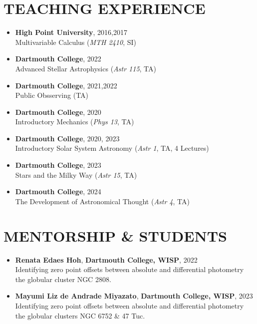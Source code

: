 \documentclass[margin, 10pt]{res} %
\begin{document}
\begin{resume}
\section{TEACHING EXPERIENCE}
\begin{itemize}
	\item {\scriptsize \textbf{High Point University}}, {\small 2016,2017} \\ Multivariable Calculus (\textit{MTH 2410}, SI)
	\item {\scriptsize \textbf{Dartmouth College}}, {\small 2022} \\ Advanced Stellar Astrophysics (\textit{Astr 115}, TA)
	\item {\scriptsize \textbf{Dartmouth College}}, {\small 2021,2022} \\ Public Obsserving (TA)
	\item {\scriptsize \textbf{Dartmouth College}}, {\small 2020} \\ Introductory Mechanics (\textit{Phys 13}, TA)
	\item {\scriptsize \textbf{Dartmouth College}}, {\small 2020, 2023} \\ Introductory Solar System Astronomy (\textit{Astr 1}, TA, 4 Lectures)
	\item {\scriptsize \textbf{Dartmouth College}}, {\small 2023} \\ Stars and the Milky Way (\textit{Astr 15}, TA)
	\item {\scriptsize \textbf{Dartmouth College}}, {\small 2024} \\ The Development of Astronomical Thought (\textit{Astr 4}, TA)
\end{itemize}

\section{MENTORSHIP \& STUDENTS}
\begin{itemize}
	\item \textbf{Renata Edaes Hoh}, {\scriptsize \textbf{Dartmouth College, WISP}}, {\small 2022} \\ Identifying zero point offsets between absolute and differential photometry the globular cluster NGC 2808.
	\item \textbf{Mayumi Liz de Andrade Miyazato}, {\scriptsize \textbf{Dartmouth College, WISP}}, {\small 2023} \\ Identifying zero point offsets between absolute and differential photometry the globular clusters NGC 6752 \& 47 Tuc.
\end{itemize}



\end{resume}
\end{document}
